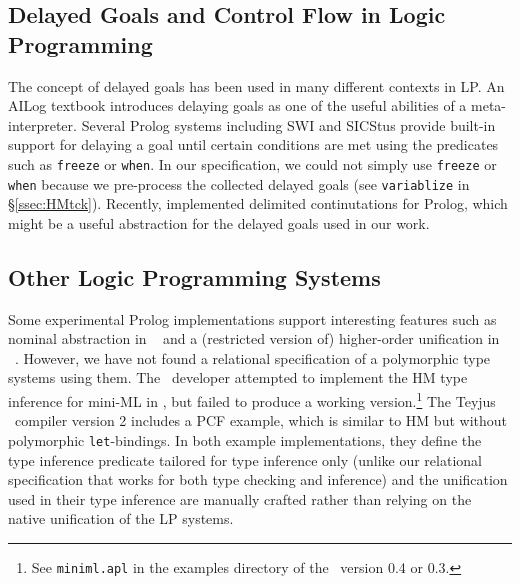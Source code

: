 \subsection{Delayed Goals and Control Flow in Logic Programming}
The concept of delayed goals has been used in many different contexts in LP.
An AILog
	 textbook \cite{AILogTextBook}
introduces delaying goals as one of the useful abilities of a meta-interpreter.
Several Prolog systems including SWI and SICStus provide built-in support for
delaying a goal until certain conditions are met using the predicates
such as {\small\verb|freeze|} or {\small\verb|when|}. In our specification,
we could not simply use {\small\verb|freeze|} or {\small\verb|when|}
because we pre-process the collected delayed goals (see \verb|variablize|
in \S\ref{ssec:HMtck}).
Recently, \citet{SchDemDesWei13} implemented delimited continutations for
Prolog, which might be a useful abstraction for the delayed goals 
used in our work.

\subsection{Other Logic Programming Systems}\label{ssec:otherLP}
Some experimental Prolog implementations support interesting features such as
nominal abstraction in \aProlog\ \cite{cheney04iclp} and a (restricted version
of) higher-order unification in \lProlog\ \cite{nadathur99cade}. However, we
have not found a relational specification of a polymorphic type systems using
them. The \aProlog\ developer attempted to implement the HM type inference for
mini-ML in \aProlog, but failed to produce a working version.\footnote{
	See \texttt{miniml.apl} in the examples directory of
	the \aProlog\ version 0.4 or 0.3.}
The Teyjus \lProlog\ compiler version 2 includes a PCF \cite{Scott69} example,
which is similar to HM but without polymorphic \texttt{let}-bindings.
In both example implementations, they define the type inference predicate
tailored for type inference only (unlike our relational specification that
works for both type checking and inference) and the unification used in
their type inference are manually crafted rather than relying on
the native unification of the LP systems.

